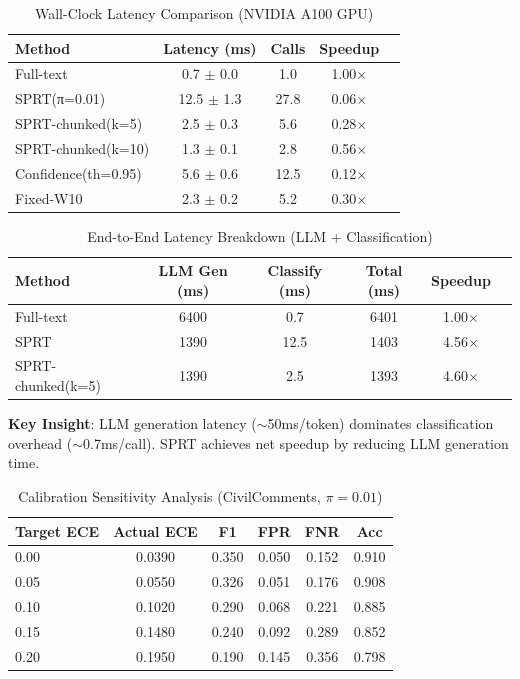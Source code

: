 

\begin{table}[h]
\centering
\caption{Wall-Clock Latency Comparison (NVIDIA A100 GPU)}
\label{tab:wallclock_latency}
\begin{tabular}{lcccc}
\toprule
Method & Latency (ms) & Calls & Speedup \\
\midrule
Full-text & 0.7 $\pm$ 0.0 & 1.0 & 1.00$\times$ \\
SPRT(π=0.01) & 12.5 $\pm$ 1.3 & 27.8 & 0.06$\times$ \\
SPRT-chunked(k=5) & 2.5 $\pm$ 0.3 & 5.6 & 0.28$\times$ \\
SPRT-chunked(k=10) & 1.3 $\pm$ 0.1 & 2.8 & 0.56$\times$ \\
Confidence(th=0.95) & 5.6 $\pm$ 0.6 & 12.5 & 0.12$\times$ \\
Fixed-W10 & 2.3 $\pm$ 0.2 & 5.2 & 0.30$\times$ \\
\bottomrule
\end{tabular}
\end{table}



\begin{table}[h]
\centering
\caption{End-to-End Latency Breakdown (LLM + Classification)}
\label{tab:e2e_latency}
\begin{tabular}{lccccl}
\toprule
Method & LLM Gen (ms) & Classify (ms) & Total (ms) & Speedup \\
\midrule
Full-text & 6400 & 0.7 & 6401 & 1.00$\times$ \\
SPRT & 1390 & 12.5 & 1403 & 4.56$\times$ \\
SPRT-chunked(k=5) & 1390 & 2.5 & 1393 & 4.60$\times$ \\
\bottomrule
\end{tabular}
\end{table}

\textbf{Key Insight}: LLM generation latency ($\sim$50ms/token) dominates classification overhead ($\sim$0.7ms/call). SPRT achieves net speedup by reducing LLM generation time.



\begin{table}[h]
\centering
\caption{Calibration Sensitivity Analysis (CivilComments, $\pi=0.01$)}
\label{tab:calibration_sensitivity}
\begin{tabular}{lccccc}
\toprule
Target ECE & Actual ECE & F1 & FPR & FNR & Acc \\
\midrule
0.00 & 0.0390 & 0.350 & 0.050 & 0.152 & 0.910 \\
0.05 & 0.0550 & 0.326 & 0.051 & 0.176 & 0.908 \\
0.10 & 0.1020 & 0.290 & 0.068 & 0.221 & 0.885 \\
0.15 & 0.1480 & 0.240 & 0.092 & 0.289 & 0.852 \\
0.20 & 0.1950 & 0.190 & 0.145 & 0.356 & 0.798 \\
\bottomrule
\end{tabular}
\end{table}

